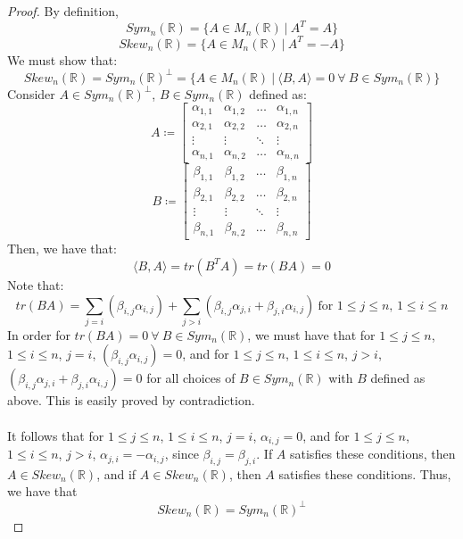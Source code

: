 \documentclass{article}
\begin{document}
\begin{proof}
By definition,
$$Sym_{n}(\mathbb{R}) = \{ A \in M_{n}(\mathbb{R}) \ \vert \ A^{T} = A \}$$
$$Skew_{n}(\mathbb{R}) = \{ A \in M_{n}(\mathbb{R}) \ \vert \ A^{T} = -A \}$$
We must show that:
$$Skew_{n}(\mathbb{R}) = Sym_{n}(\mathbb{R})^{\perp} = \{ A \in M_{n}(\mathbb{R}) \ \vert \ \langle B, A \rangle = 0 \ \forall \ B \in Sym_{n}(\mathbb{R}) \}$$
Consider $A \in Sym_{n}(\mathbb{R})^{\perp}$, $B \in Sym_{n}(\mathbb{R})$ defined as:
$$A \coloneqq \begin{bmatrix} \alpha_{1, 1} & \alpha_{1, 2} & \dots & \alpha_{1, n} \\ \alpha_{2, 1} & \alpha_{2, 2} & \dots & \alpha_{2, n} \\ \vdots & \vdots & \ddots & \vdots \\ \alpha_{n, 1} & \alpha_{n, 2} & \dots & \alpha_{n, n} \end{bmatrix}$$
$$B \coloneqq \begin{bmatrix} \beta_{1, 1} & \beta_{1, 2} & \dots & \beta_{1, n} \\ \beta_{2, 1} & \beta_{2, 2} & \dots & \beta_{2, n} \\ \vdots & \vdots & \ddots & \vdots \\ \beta_{n, 1} & \beta_{n, 2} & \dots & \beta_{n, n} \end{bmatrix}$$
Then, we have that:
$$\langle B, A \rangle = tr(B^{T}A) =  tr(BA) = 0$$
Note that:
$$tr(BA) = \sum\limits_{j = i} (\beta_{i, j}\alpha_{i, j}) + \sum\limits_{j > i} (\beta_{i, j}\alpha_{j, i} + \beta_{j, i}\alpha_{i, j}) \ \text{for $1 \leq j \leq n$, $1 \leq i \leq n$}$$
In order for $tr(BA) = 0 \ \forall \ B \in Sym_{n}(\mathbb{R})$, we must have that for $1 \leq j \leq n$, $1 \leq i \leq n$, $j = i$, $(\beta_{i, j}\alpha_{i, j}) = 0$, and for $1 \leq j \leq n$, $1 \leq i \leq n$, $j > i$, $(\beta_{i, j}\alpha_{j, i} + \beta_{j, i}\alpha_{i, j}) = 0$ for all choices of $B \in Sym_{n}(\mathbb{R})$ with $B$ defined as above. This is easily proved by contradiction. \\
\\
It follows that for $1 \leq j \leq n$, $1 \leq i \leq n$, $j = i$, $\alpha_{i, j} = 0$, and for $1 \leq j \leq n$, $1 \leq i \leq n$, $j > i$, $\alpha_{j, i} = -\alpha_{i, j}$, since $\beta_{i, j} = \beta_{j, i}$. If $A$ satisfies these conditions, then $A \in Skew_{n}(\mathbb{R})$, and if  $A \in Skew_{n}(\mathbb{R})$, then $A$ satisfies these conditions. Thus, we have that $$Skew_{n}(\mathbb{R}) = Sym_{n}(\mathbb{R})^{\perp}$$
\end{proof}
\end{document}
